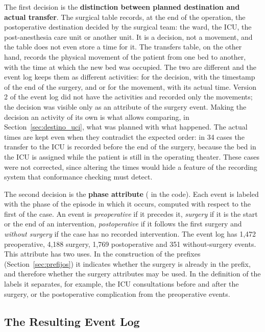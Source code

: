 The first decision is the \textbf{distinction between planned destination and actual transfer}. The surgical table records, at the end of the operation, the postoperative destination decided by the surgical team: the ward, the ICU, the post-anesthesia care unit or another unit. It is a decision, not a movement, and the table does not even store a time for it. The transfers table, on the other hand, records the physical movement of the patient from one bed to another, with the time at which the new bed was occupied. The two are different and the event log keeps them as different activities:  for the decision, with the timestamp of the end of the surgery, and  or  for the movement, with its actual time. Version 2 of the event log did not have the  activities and recorded only the movements; the decision was visible only as an attribute of the surgery event. Making the decision an activity of its own is what allows comparing, in Section~\ref{sec:destino_uci}, what was planned with what happened. The actual times are kept even when they contradict the expected order: in 34 cases the transfer to the ICU is recorded before the end of the surgery, because the bed in the ICU is assigned while the patient is still in the operating theater. These cases were not corrected, since altering the times would hide a feature of the recording system that conformance checking must detect.

The second decision is the \textbf{phase attribute} ( in the code). Each event is labeled with the phase of the episode in which it occurs, computed with respect to the first  of the case. An event is \emph{preoperative} if it precedes it, \emph{surgery} if it is the start or the end of an intervention, \emph{postoperative} if it follows the first surgery and \emph{without surgery} if the case has no recorded intervention. The event log has 1,472 preoperative, 4,188 surgery, 1,769 postoperative and 351 without-surgery events. This attribute has two uses. In the construction of the prefixes (Section~\ref{sec:prefijos}) it indicates whether the surgery is already in the prefix, and therefore whether the surgery attributes may be used. In the definition of the labels it separates, for example, the ICU consultations before and after the surgery, or the postoperative complication from the preoperative events.

\subsection{The Resulting Event Log}

